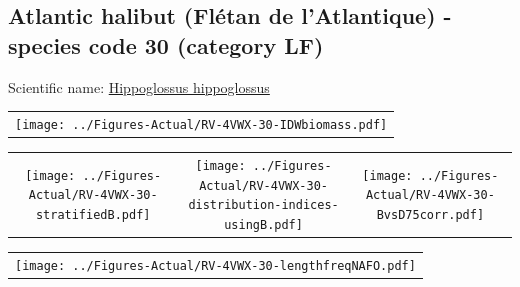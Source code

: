 \documentclass[12pt]{article}\usepackage[]{graphicx}\usepackage[]{color}
\begin{document}
\renewcommand\thefigure{\thesubsection\Alph{figure}}

\setcounter{figure}{0}

\hypertarget{sec:30}{%
\subsection{Atlantic halibut (Flétan de l'Atlantique) - species code 30 (category LF)}\label{sec:30}}

  


Scientific name: \href{http://www.marinespecies.org/aphia.php?p=taxdetails\&id=127138}{Hippoglossus hippoglossus} \newline
\begin{minipage}{1.0\textwidth}
 \begin{tabular}{c}
\texttt{[image: ../Figures-Actual/RV-4VWX-30-IDWbiomass.pdf]} \\ 
\end{tabular} 
\end{minipage}
\newline

\vspace{1cm}
\begin{minipage}{1.0\textwidth}
 \begin{tabular}{ccc}
\texttt{[image: ../Figures-Actual/RV-4VWX-30-stratifiedB.pdf]} & 
\texttt{[image: ../Figures-Actual/RV-4VWX-30-distribution-indices-usingB.pdf]} & 
\texttt{[image: ../Figures-Actual/RV-4VWX-30-BvsD75corr.pdf]} \\ 
\end{tabular} 
\end{minipage}
\clearpage
\begin{minipage}{1.0\textwidth}
 \begin{tabular}{c}
\texttt{[image: ../Figures-Actual/RV-4VWX-30-lengthfreqNAFO.pdf]} \\ 
\end{tabular} 
\end{minipage}
\newline
\end{document}
